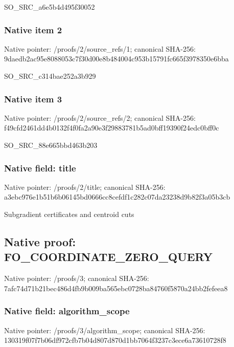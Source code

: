 \documentclass[10pt,a4paper]{article}
\begin{document}
\begingroup\raggedright\sloppy SO\_\allowbreak{}SRC\_\allowbreak{}a6e5b4d495f30052\par\endgroup

\subsubsection{Native item 2}
Native pointer: /proofs/2/source\_\allowbreak{}refs/1; canonical SHA-256: 9daedb2ac95e8088053c7f30d00e8b484004c953b15791fc665f3978350e6bba

\begingroup\raggedright\sloppy SO\_\allowbreak{}SRC\_\allowbreak{}c314bae252a3b929\par\endgroup

\subsubsection{Native item 3}
Native pointer: /proofs/2/source\_\allowbreak{}refs/2; canonical SHA-256: f49cfd2461dd4b0132f4f0fa2a90e3f29883781b5ad0bff19390f24edc0bff0c

\begingroup\raggedright\sloppy SO\_\allowbreak{}SRC\_\allowbreak{}88e665bbd463b203\par\endgroup

\subsubsection{Native field: title}
Native pointer: /proofs/2/title; canonical SHA-256: a3ebc976e1b51b6b06145bd0666cc8cefdf1c282c07da23238d9b82f3a05b3cb

\begingroup\raggedright\sloppy Subgradient certificates and centroid cuts\par\endgroup

\subsection{Native proof: FO\_\allowbreak{}COORDINATE\_\allowbreak{}ZERO\_\allowbreak{}QUERY}
Native pointer: /proofs/3; canonical SHA-256: 7afc74d71b21bec486d4fb9b009ba565ebc0728ba84760f5870a24bb2fefeea8

\subsubsection{Native field: algorithm\_\allowbreak{}scope}
Native pointer: /proofs/3/algorithm\_\allowbreak{}scope; canonical SHA-256: 130319f07f7b06df972cfb7b04d807d870d1bb7064f3237c3ece6a73610728f8
\end{document}
